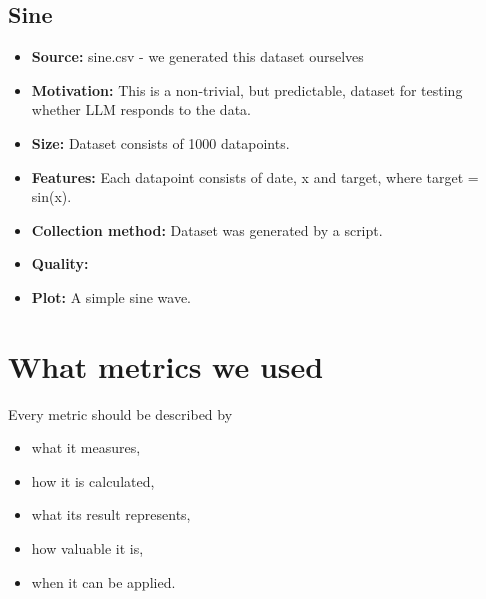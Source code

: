 \subsection{Sine}
\begin{itemize}
	\item \textbf{Source:} sine.csv - we generated this dataset ourselves
	\item \textbf{Motivation:} This is a non-trivial, but predictable, dataset for testing whether LLM responds to the data.
	\item \textbf{Size:} Dataset consists of 1000 datapoints.
	\item \textbf{Features:} Each datapoint consists of date, x and target, where target = sin(x).
	\item \textbf{Collection method:} Dataset was generated by a script.
	\item \textbf{Quality:}
	\item \textbf{Plot:} A simple sine wave.
\end{itemize}

\section{What metrics we used}
Every metric should be described by
\begin{itemize}
	\item what it measures,
	\item how it is calculated,
	\item what its result represents,
	\item how valuable it is,
	\item when it can be applied.
\end{itemize}
